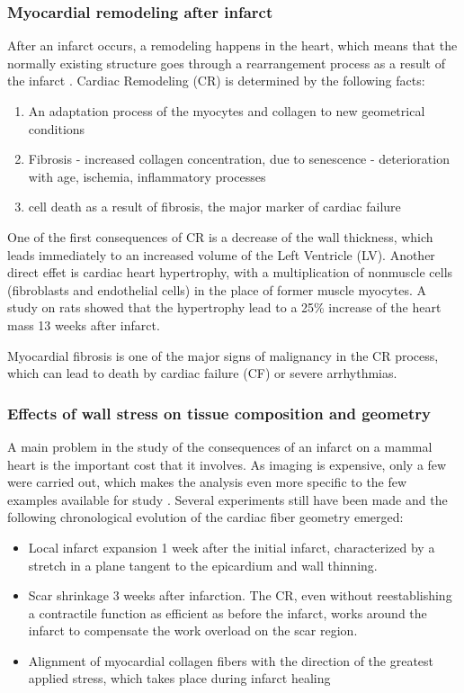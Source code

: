 \subsubsection{Myocardial remodeling after infarct}

After an infarct occurs, a remodeling happens in the heart, which means that the normally existing structure goes through a rearrangement process as a result of the infarct \cite{swynghedauw1999molecular}. Cardiac Remodeling (CR) is determined by the following facts:
\begin{enumerate}
    \item An adaptation process of the myocytes and collagen to new geometrical conditions
    \item Fibrosis - increased collagen concentration, due to senescence - deterioration with age, ischemia, inflammatory processes
    \item cell death as a result of fibrosis, the major marker of cardiac failure
\end{enumerate}
One of the first consequences of CR is a decrease of the wall thickness, which leads immediately to an increased volume of the Left Ventricle (LV). Another direct effet is cardiac heart hypertrophy, with a multiplication of nonmuscle cells (fibroblasts and endothelial cells) in the place of former muscle myocytes. A study on rats \cite{mccormick1994regional} showed that the hypertrophy lead to a 25\% increase of the heart mass 13 weeks after infarct.

Myocardial fibrosis is one of the major signs of malignancy in the CR process, which can lead to death by cardiac failure (CF) or severe arrhythmias.

\subsubsection{Effects of wall stress on tissue composition and geometry}

A main problem in the study of the consequences of an infarct on a mammal heart is the important cost that it involves. As imaging is expensive, only a few were carried out, which makes the analysis even more specific to the few examples available for study \cite{holmes1994scar}. Several experiments still have been made and the following chronological evolution of the cardiac fiber geometry emerged:
\begin{itemize}
    \item Local infarct expansion 1 week after the initial infarct, characterized by a stretch in a plane tangent to the epicardium and wall thinning.
    \item Scar shrinkage 3 weeks after infarction. The CR, even without reestablishing a contractile function as efficient as before the infarct, works around the infarct to compensate the work overload on the scar region.
    \item Alignment of myocardial collagen fibers with the direction of the greatest applied stress, which takes place during infarct healing
\end{itemize}


